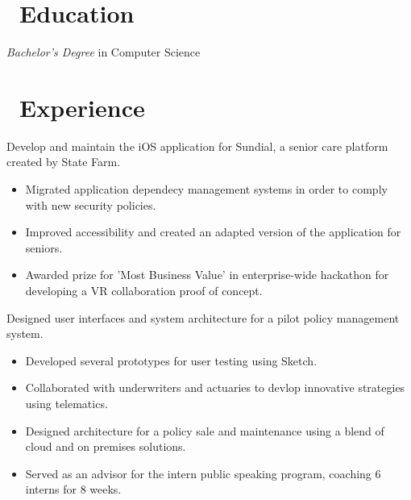 \documentclass{resume}
\begin{document}



\section{\faGraduationCap\ Education}
\textit{Bachelor's Degree} in Computer Science

\section{\faUsers\ Experience}
Develop and maintain the iOS application for Sundial, a senior care platform created by State Farm.
\begin{itemize}
  \item Migrated application dependecy management systems in order to comply with new security policies.
  \item Improved accessibility and created an adapted version of the application for seniors.
  \item Awarded prize for 'Most Business Value' in enterprise-wide hackathon for developing a VR collaboration proof of concept.
\end{itemize}

Designed user interfaces and system architecture for a pilot policy management system.
\begin{itemize}
  \item Developed several prototypes for user testing using Sketch.
  \item Collaborated with underwriters and actuaries to devlop innovative strategies using telematics.
  \item Designed architecture for a policy sale and maintenance using a blend of cloud and on premises solutions. 
  \item Served as an advisor for the intern public speaking program, coaching 6 interns for 8 weeks.
\end{itemize}
\end{document}
